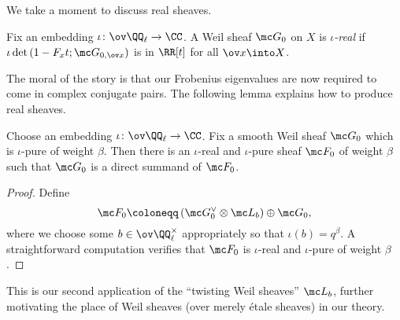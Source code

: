 \documentclass[../notes.tex]{subfiles}
\begin{document}
We take a moment to discuss real sheaves.
\begin{definition}[real]
	Fix an embedding $\iota\colon\ov\QQ_\ell\to\CC$. A Weil sheaf $\mc G_0$ on $X$ is \textit{$\iota$-real} if $\iota\det\left(1-F_xt;\mc G_{0,\ov x}\right)$ is in $\RR[t]$ for all $\ov x\into X$.
\end{definition}
The moral of the story is that our Frobenius eigenvalues are now required to come in complex conjugate pairs. The following lemma explains how to produce real sheaves.
\begin{lemma}
	Choose an embedding $\iota\colon\ov\QQ_\ell\to\CC$. Fix a smooth Weil sheaf $\mc G_0$ which is $\iota$-pure of weight $\beta$. Then there is an $\iota$-real and $\iota$-pure sheaf $\mc F_0$ of weight $\beta$ such that $\mc G_0$ is a direct summand of $\mc F_0$.
\end{lemma}
\begin{proof}
	Define
	\[\mc F_0\coloneqq\left(\mc G_0^\lor\otimes\mc L_b\right)\oplus\mc G_0,\]
	where we choose some $b\in\ov\QQ_\ell^\times$ appropriately so that $\iota(b)=q^\beta$. A straightforward computation verifies that $\mc F_0$ is $\iota$-real and $\iota$-pure of weight $\beta$.
\end{proof}
\begin{remark}
	This is our second application of the ``twisting Weil sheaves'' $\mc L_b$, further motivating the place of Weil sheaves (over merely \'etale sheaves) in our theory.
\end{remark}
\end{document}
